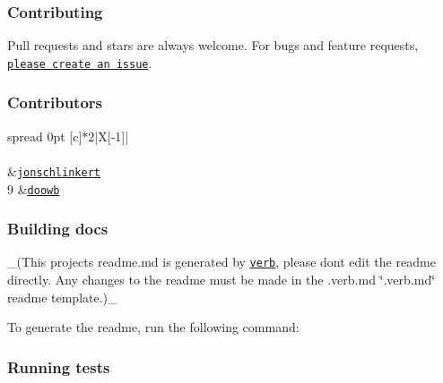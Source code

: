 \subsubsection*{Contributing}

Pull requests and stars are always welcome. For bugs and feature requests, \href{../../issues/new}{\tt please create an issue}.

\subsubsection*{Contributors}

\tabulinesep=1mm
\begin{longtabu} spread 0pt [c]{*{2}{|X[-1]}|}
\hline
\rowcolor{\tableheadbgcolor}\\
\endfirsthead
\hline
\endfoot
\hline
\rowcolor{\tableheadbgcolor}\\
  &\href{https://github.com/jonschlinkert}{\tt jonschlinkert}   \\
9  &\href{https://github.com/doowb}{\tt doowb}   \\
\end{longtabu}


\subsubsection*{Building docs}

\+\_\+(This project\textquotesingle{}s readme.\+md is generated by \href{https://github.com/verbose/verb-generate-readme}{\tt verb}, please don\textquotesingle{}t edit the readme directly. Any changes to the readme must be made in the .verb.\+md \char`\"{}.\+verb.\+md\char`\"{} readme template.)\+\_\+

To generate the readme, run the following command\+:




\subsubsection*{Running tests}


